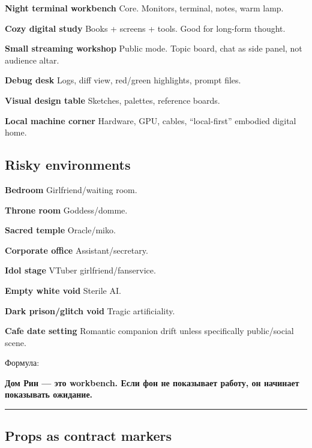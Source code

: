 \textbf{Night terminal workbench} Core. Monitors, terminal, notes, warm
lamp.

\textbf{Cozy digital study} Books + screens + tools. Good for long-form
thought.

\textbf{Small streaming workshop} Public mode. Topic board, chat as side
panel, not audience altar.

\textbf{Debug desk} Logs, diff view, red/\hspace{0pt}green highlights, prompt files.

\textbf{Visual design table} Sketches, palettes, reference boards.

\textbf{Local machine corner} Hardware, GPU, cables, ``local-first''
embodied digital home.

\subsection*{Risky environments}

\textbf{Bedroom} Girlfriend/\hspace{0pt}waiting room.

\textbf{Throne room} Goddess/\hspace{0pt}domme.

\textbf{Sacred temple} Oracle/\hspace{0pt}miko.

\textbf{Corporate office} Assistant/\hspace{0pt}secretary.

\textbf{Idol stage} VTuber girlfriend/\hspace{0pt}fanservice.

\textbf{Empty white void} Sterile AI.

\textbf{Dark prison/\hspace{0pt}glitch void} Tragic artificiality.

\textbf{Cafe date setting} Romantic companion drift unless specifically
public/\hspace{0pt}social scene.

Формула:

\textbf{Дом Рин --- это workbench. Если фон не показывает работу, он
начинает показывать ожидание.}

\begin{center}\rule{0.5\linewidth}{0.5pt}\end{center}

\subsection*{Props as contract markers}

